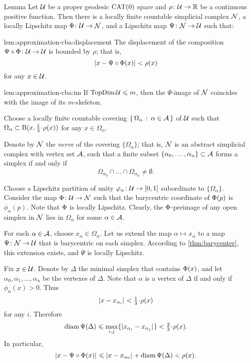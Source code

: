\begin{thm}{Lemma}\label{lem:approximation-cba}
Let $\mathcal{U}$ be a proper geodesic $\mathrm{CAT}(0)$ space
and $\rho\:\spc{U}\z\to\RR$ be a continuous positive function.
Then there is a locally finite countable simplicial complex $\mathcal{N}$,
a locally Lipschitz map $\map\:\spc{U}\z\to \spc{N}$, 
and a Lipschitz map $\Psi\colon\mathcal{N}\to\mathcal{U}$ such that:

\begin{subthm}{lem:approximation-cba:displacement}
The displacement of the composition $\Psi\circ\Phi\colon\mathcal{U}\to\mathcal{U}$ is bounded by $\rho$;
that is,
\[\dist{x}{\Psi\circ\map(x)}{}<\rho(x)\] 
for any $x\in\mathcal{U}$.
\end{subthm}

\begin{subthm}{lem:approximation-cba:im}
If $\mathop{\rm TopDim}\nolimits\mathcal{U}\leqslant m$, 
then the $\Psi$-image of $\mathcal{N}$ 
coincides with the image of its $m$-skeleton.
\end{subthm}

\end{thm}

Choose a locally finite countable covering $\left\{\,{\Omega_\alpha}\,:\,{\alpha\in\mathcal{A}}\,\right\}$ of $\mathcal{U}$ such that $\Omega_\alpha\subset \oBall(x,\tfrac{1}{3}\cdot\rho(x))$ for any $x\in \Omega_\alpha$. 

Denote by $\mathcal{N}$ the \emph{nerve} of the covering $\{\Omega_\alpha\}$;
that is, $\mathcal{N}$ is an abstract simplicial complex with 
vertex set $\mathcal{A}$,
such that a finite subset 
$\{\alpha_0,\z\dots,\alpha_n\}\subset\IndexSet$ 
forms a simplex if and only if
\[\Omega_{\alpha_0}
\cap
\dots\cap
\Omega_{\alpha_n}\ne\emptyset.\]

Choose a Lipschitz partition of unity 
$\varphi_\alpha\colon\mathcal{U}\to [0,1]$ subordinate to $\{\Omega_\alpha\}$.
Consider the map $\Phi\colon\mathcal{U}\to \mathcal{N}$ such that the barycentric coordinate of $\Phi(p)$ is $\phi_\alpha(p)$.
Note that $\Phi$ is locally Lipschitz. 
Clearly, the $\Phi$-preimage of any open simplex in $\mathcal{N}$ lies in $\Omega_\alpha$ for some $\alpha\in\mathcal{A}$.

For each $\alpha\in\mathcal{A}$, 
choose $x_\alpha\in\Omega_\alpha$.
Let us extend the map $\alpha\mapsto x_\alpha$
to a map $\Psi\colon\mathcal{N}\to\mathcal{U}$ that is barycentric on each simplex.
According to \ref{thm:barycenter}, this extension exists, 
and $\Psi$ is locally Lipschitz.

Fix $x\in\mathcal{U}$. Denote by $\Delta$ the minimal simplex that contains $\Phi(x)$, 
and let $\alpha_0,\alpha_1,\dots,\alpha_n$ be the vertexes of $\Delta$.
Note that $\alpha$ is a vertex of $\Delta$ if and only if $\phi_{\alpha}(x)>0$.
Thus
\[\dist{x}{x_{\alpha_i}}{}<\tfrac{1}{3}\cdot\rho(x)\] 
for any $i$.
Therefore 
\[\diam\Psi(\Delta)
\le
\max_{i,j}\{\dist{x_{\alpha_i}}{x_{\alpha_j}}{}\}
<
\tfrac{2}{3}\cdot\rho(x).\]
In particular, 
\[\dist{x}{\Psi\circ\map(x)}{}\le\dist{x}{x_{\alpha_0}}{}+\diam \Psi(\Delta) <\rho(x).\]

